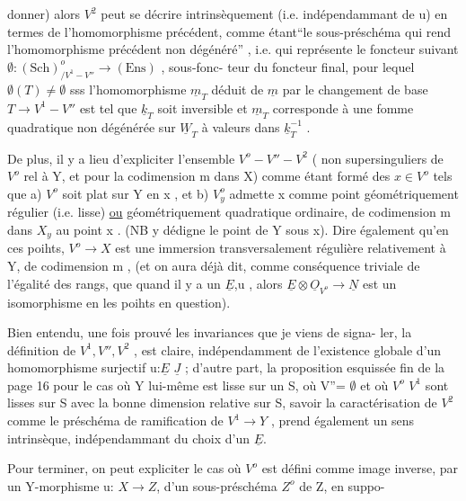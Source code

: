 donner) alors $V^2$ peut se décrire intrinsèquement (i.e. indépendammant de u)
 en termes de l'homomorphisme précédent, comme étant``le sous-préschéma
qui rend l'homomorphisme précédent non dégénéré'' , i.e. qui représente le
foncteur suivant $\emptyset : (\mathrm{Sch})^{o}_{/V^1 - V''} \longrightarrow (\mathrm{Ens})$ , sous-fonc-%
teur du foncteur final, pour lequel $\emptyset(T)\neq \emptyset$ sss l'homomorphisme $\underline{m}_T$ déduit
de $\underline{m}$ par le changement de base $T \to V^1 - V''$ est tel que $\underline{k}_T$ soit inversible et
$\underline{m}_T$ corresponde à une fomme quadratique non dégénérée sur $\underline{W}_T$ à valeurs dans
$\underline{k}_T^{-1}$ .

De plus, il y a lieu  d'expliciter l'ensemble $V^o - V'' - V^2$ 
( non supersinguliers de $V^o$ rel à Y, et pour la codimension m dans X)
comme étant formé des $x \in V^o$ tels que a) $V^o$ soit plat sur Y en x , et
b) $V^o_y$ admette x comme point géométriquement régulier (i.e. lisse) \uline{ou}
géométriquement  quadratique ordinaire, de codimension m dans $X_y$
au point x . (NB y dédigne le point de Y sous x). Dire également qu'en ces
poihts, $V^o \longrightarrow X$ est une immersion transversalement régulière relativement à
Y, de codimension m , (et on aura déjà dit, comme conséquence triviale de
l'égalité des rangs, que quand il y a un $\underline{E}$,u , alors $\underline{E}\otimes\underline{O}_{V^o} \to \underline{N}$ est un
isomorphisme en les poihts en question).

Bien entendu, une fois prouvé les invariances que je viens de signa-%
ler, la définition de $V^1, V'', V^2$ ,  est claire, indépendamment
de l'existence globale d'un homomorphisme surjectif u:$\underline{E}$ \quad $\underline{J}$ ; d'autre part,
la proposition esquissée fin de la page 16 pour le cas où Y lui-même est
lisse sur un S, où V''= $\emptyset$ et où $V^o$ $V^1$ sont lisses sur S avec la bonne dimension
relative sur S,  savoir la caractérisation de $V^2$ comme le
préschéma de ramification de $V^1 \longrightarrow Y$ , prend également un sens intrinsèque,
indépendammant du choix d'un $\underline{E}$.

Pour terminer, on peut expliciter le cas où $V^o$ est défini comme image
inverse, par un Y-morphisme u: $X \to Z$, d'un sous-préschéma $Z^o$ de Z, en suppo-%
